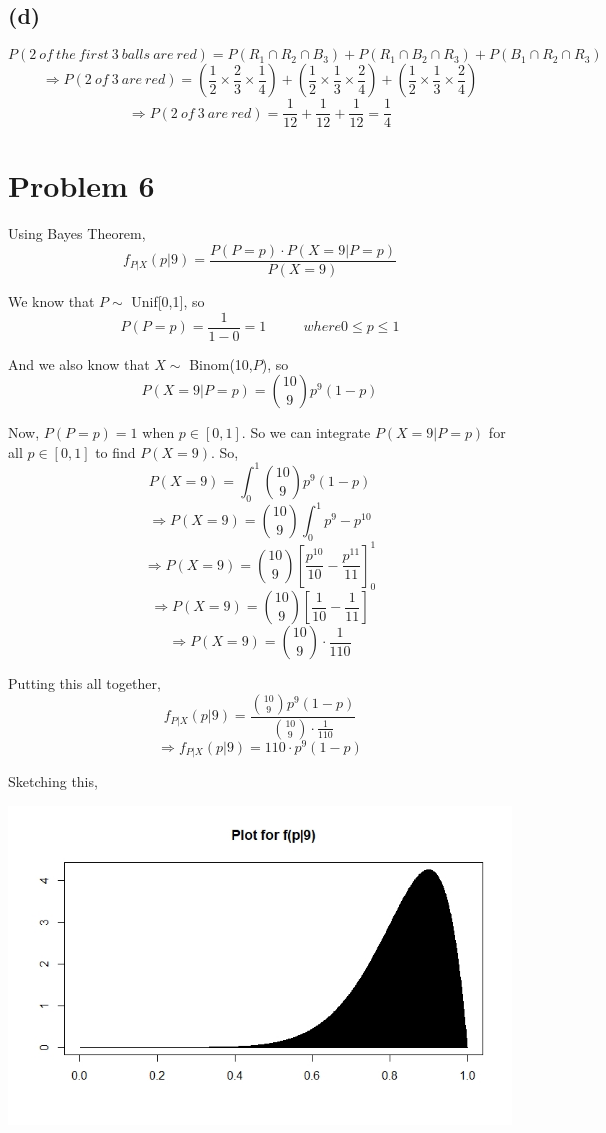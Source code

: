 \documentclass{article}
\begin{document}
		\subsection*{(d)}
			$$ P(2\ of\ the\ first\ 3\ balls\ are\ red) = P(R_1 \cap R_2 \cap B_3) + P(R_1 \cap B_2 \cap R_3) + P(B_1 \cap R_2 \cap R_3) $$
			$$ \Rightarrow P(2\ of\ 3\ are\ red) = \left( \frac{1}{2} \times \frac{2}{3} \times \frac{1}{4} \right) + \left( \frac{1}{2}\times \frac{1}{3}\times \frac{2}{4}\right) + \left( \frac{1}{2}\times \frac{1}{3}\times \frac{2}{4} \right)$$
			$$ \Rightarrow P(2\ of\ 3\ are\ red) = \frac{1}{12}+\frac{1}{12}+\frac{1}{12} = \frac{1}{4} $$ 

	\section*{Problem 6}
		Using Bayes Theorem,
		$$ f_{P|X}(p|9)= \frac{P(P=p) \cdot P(X=9|P=p)}{P(X=9)}$$
		
		We know that $P\sim$ Unif[0,1], so
		$$ P(P=p) = \frac{1}{1-0} = 1 \; \; \; \; \ \;\ \; \; \;  where 0 \leq p \leq 1 $$

		And we also know that $X\sim$ Binom(10,$P$), so
		$$ P(X=9|P=p) = {10 \choose 9} p^9 (1-p) $$

		Now, $P(P=p)=1$ when $p \in [0,1]$. So we can integrate $P(X=9|P=p)$ for all $p \in [0,1]$ to find $P(X=9)$. So,
		$$ P(X=9) = \int_{0}^{1} {10 \choose 9} p^9 (1-p) $$
		$$ \Rightarrow P(X=9)= {10 \choose 9} \int_{0}^{1} p^9-p^{10} $$
		$$ \Rightarrow P(X=9)= {10 \choose 9} \left[ \frac{p^{10}}{10} - \frac{p^{11}}{11}\right]_{0}^{1} $$
		$$ \Rightarrow P(X=9)= {10 \choose 9}  \left[ \frac{1}{10} - \frac{1}{11}\right] $$
		$$ \Rightarrow P(X=9)= {10 \choose 9} \cdot \frac{1}{110} $$

		Putting this all together,
		$$  f_{P|X}(p|9)= \frac{ {10 \choose 9} p^9 (1-p) }{ {10 \choose 9} \cdot \frac{1}{110} }$$
		$$ \Rightarrow   f_{P|X}(p|9)= 110 \cdot p^9 (1-p) $$


		Sketching this, 

		\centering
		\includegraphics[width=\textwidth]{Rplot}
\end{document}

